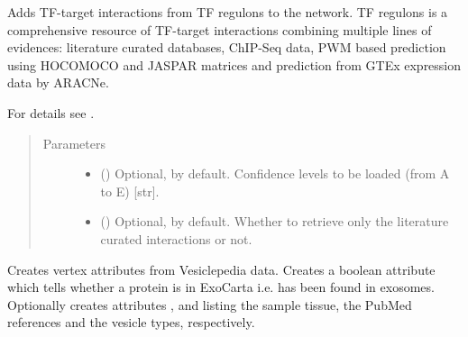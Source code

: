 \documentclass[letterpaper,10pt,english]{sphinxmanual}
\begin{document}
\begin{fulllineitems}
\begin{fulllineitems}
\end{fulllineitems}


\begin{fulllineitems}
\label{\detokenize{main:pypath.main.PyPath.load_tfregulons}}
Adds TF-target interactions from TF regulons to the network.
TF regulons is a comprehensive resource of TF-target
interactions combining multiple lines of evidences: literature
curated databases, ChIP-Seq data, PWM based prediction using
HOCOMOCO and JASPAR matrices and prediction from GTEx expression
data by ARACNe.

For details see .
\begin{quote}\begin{description}
\item[{Parameters}] \leavevmode\begin{itemize}
\item {} 
 () \textendash{} Optional,  by default. Confidence levels to be
loaded (from A to E) {[}str{]}.

\item {} 
 () \textendash{} Optional,  by default. Whether to retrieve only the
literature curated interactions or not.

\end{itemize}

\end{description}\end{quote}

\end{fulllineitems}


\begin{fulllineitems}
\label{\detokenize{main:pypath.main.PyPath.load_vesiclepedia_attrs}}
Creates vertex attributes from Vesiclepedia data. Creates a boolean
attribute  which tells whether a protein is
in ExoCarta i.e. has been found in exosomes. Optionally creates
attributes ,  and
 listing the sample tissue, the PubMed
references and the vesicle types, respectively.


\end{fulllineitems}
\end{fulllineitems}
\end{document}
